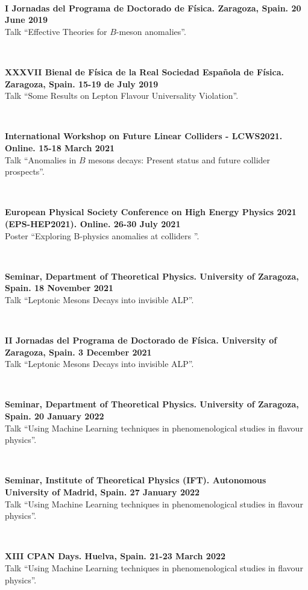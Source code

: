 \documentclass[combined.tex]{subfiles}
\begin{document}
~

\textbf{I Jornadas del Programa de Doctorado de Física. Zaragoza, Spain. 20 June 2019}\\
Talk ``Effective Theories for $B$-meson anomalies''.

~

\textbf{XXXVII Bienal de Física de la Real Sociedad Española de Física. Zaragoza, Spain. 15-19 de July 2019}\\
Talk ``Some Results on Lepton Flavour Universality Violation''.

~

\textbf{International Workshop on Future Linear Colliders - LCWS2021. Online. 15-18 March 2021}\\
Talk ``Anomalies in $B$ mesons decays: Present status and future collider prospects''.

~

\textbf{European Physical Society Conference on High Energy Physics 2021 (EPS-HEP2021). Online. 26-30 July 2021}\\
Poster ``Exploring B-physics anomalies at colliders ''.

~

\textbf{Seminar, Department of Theoretical Physics. University of Zaragoza, Spain. 18 November 2021}\\
Talk ``Leptonic Mesons Decays into invisible ALP''.

~

\textbf{II Jornadas del Programa de Doctorado de Física. University of Zaragoza, Spain. 3 December 2021}\\
Talk ``Leptonic Mesons Decays into invisible ALP''.

~

\textbf{Seminar, Department of Theoretical Physics. University of Zaragoza, Spain. 20 January 2022}\\
Talk ``Using Machine Learning techniques in phenomenological studies in flavour physics''.

~

\textbf{Seminar, Institute of Theoretical Physics (IFT). Autonomous University of Madrid, Spain. 27 January 2022}\\
Talk ``Using Machine Learning techniques in phenomenological studies in flavour physics''.

~

\textbf{XIII CPAN Days. Huelva, Spain. 21-23 March 2022}\\
Talk ``Using Machine Learning techniques in phenomenological studies in flavour physics''.
\end{document}
